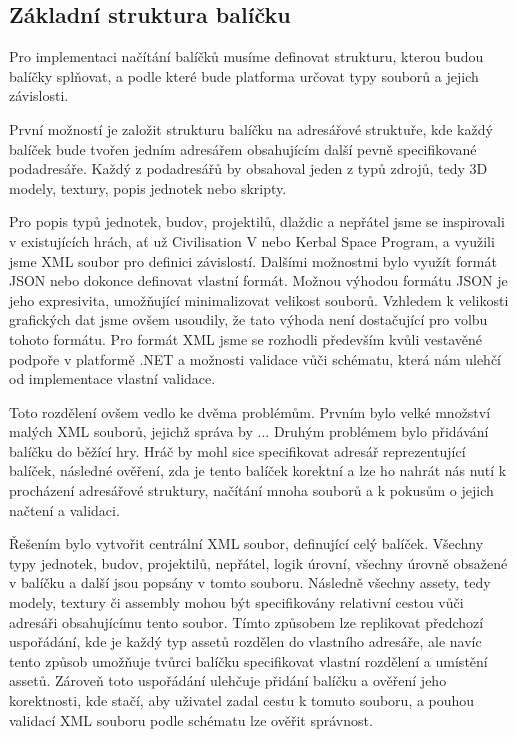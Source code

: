\subsection{Základní struktura balíčku}
Pro implementaci načítání balíčků musíme definovat strukturu, kterou budou balíčky splňovat, a podle které bude platforma určovat typy souborů a jejich závislosti. 

První možností je založit strukturu balíčku na adresářové struktuře, kde každý balíček bude tvořen jedním adresářem obsahujícím další pevně specifikované podadresáře. Každý z podadresářů by obsahoval jeden z typů zdrojů, tedy 3D modely, textury, popis jednotek nebo skripty.

Pro popis typů jednotek, budov, projektilů, dlaždic a nepřátel jsme se inspirovali v existujících hrách, ať už Civilisation V nebo Kerbal Space Program, a využili jsme XML soubor pro definici závislostí. Dalšími možnostmi bylo využít formát JSON nebo dokonce definovat vlastní formát. Možnou výhodou formátu JSON je jeho expresivita, umožňující minimalizovat velikost souborů. Vzhledem k velikosti grafických dat jsme ovšem usoudily, že tato výhoda není dostačující pro volbu tohoto formátu. Pro formát XML jsme se rozhodli především kvůli vestavěné podpoře v platformě .NET a možnosti validace vůči schématu, která nám ulehčí od implementace vlastní validace. 

Toto rozdělení ovšem vedlo ke dvěma problémům. Prvním bylo velké množství malých XML souborů, jejichž správa by ...
Druhým problémem bylo přidávání balíčku do běžící hry. Hráč by mohl sice specifikovat adresář reprezentující balíček, následné ověření, zda je tento balíček korektní a lze ho nahrát nás nutí k procházení adresářové struktury, načítání mnoha souborů a k pokusům o jejich načtení a validaci.

Řešením bylo vytvořit centrální XML soubor, definující celý balíček. Všechny typy jednotek, budov, projektilů, nepřátel, logik úrovní, všechny úrovně obsažené v balíčku a další jsou popsány v tomto souboru. Následně všechny assety, tedy modely, textury či assembly mohou být specifikovány relativní cestou vůči adresáři obsahujícímu tento soubor. Tímto způsobem lze replikovat předchozí uspořádání, kde je každý typ assetů rozdělen do vlastního adresáře, ale navíc tento způsob umožňuje tvůrci balíčku specifikovat vlastní rozdělení a umístění assetů. Zároveň toto uspořádání ulehčuje přidání balíčku a ověření jeho korektnosti, kde stačí, aby uživatel zadal cestu k tomuto souboru, a pouhou validací XML souboru podle schématu lze ověřit správnost.

